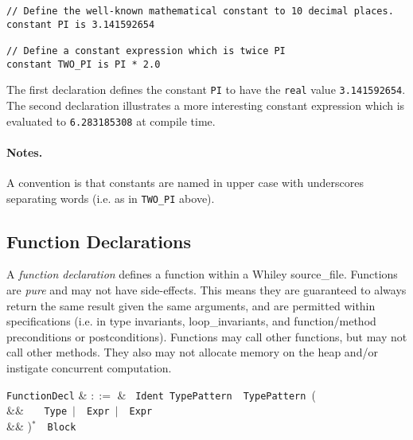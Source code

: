 \begin{lstlisting}
// Define the well-known mathematical constant to 10 decimal places.
constant PI is 3.141592654

// Define a constant expression which is twice PI
constant TWO_PI is PI * 2.0
\end{lstlisting}

The first declaration defines the constant \lstinline{PI} to have the
\lstinline{real} value \lstinline{3.141592654}.  The second
declaration illustrates a more interesting constant expression which
is evaluated to \lstinline{6.283185308} at compile time.

\paragraph{Notes.}  A convention is that constants are named in upper
case with underscores separating words (i.e. as in \lstinline{TWO_PI}
above).


\subsection{Function Declarations}
\label{c_source_files_function_decl}

A {\em function declaration} defines a function within a Whiley
\gls{source_file}.  Functions are {\em pure} and may not have
side-effects.  This means they are guaranteed to always return the
same result given the same arguments, and are permitted within
specifications (i.e. in type invariants, \gls{loop_invariant}s, and
function/method \gls{precondition}s or \gls{postcondition}s).
Functions may call other functions, but may not call other methods.
They also may not allocate memory on the heap and/or instigate
concurrent computation.

\begin{syntax}
  \verb+FunctionDecl+ & $::=$ & \ \verb+Ident+\
  \verb+TypePattern+\ \token{=>}\ \verb+TypePattern+\ \big(\\
  && \ \ \ \verb+Type+\ $|$\ \
  \verb+Expr+\ $|$\ \ \verb+Expr+\\
  && \big)$^*$\ \token{:}\ \verb+Block+\\
\end{syntax}

